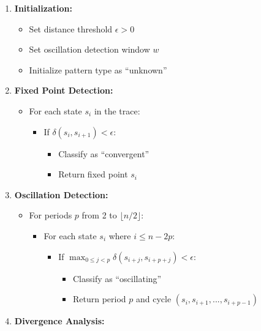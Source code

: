 \documentclass[
]{article}
\providecommand{\tightlist}{%
  \setlength{\itemsep}{0pt}\setlength{\parskip}{0pt}}
\begin{document}
\begin{enumerate}
\def\labelenumi{\arabic{enumi}.}
\tightlist
\item
  \textbf{Initialization:}

  \begin{itemize}
  \tightlist
  \item
    Set distance threshold \(\epsilon > 0\)
  \item
    Set oscillation detection window \(w\)
  \item
    Initialize pattern type as ``unknown''
  \end{itemize}
\item
  \textbf{Fixed Point Detection:}

  \begin{itemize}
  \tightlist
  \item
    For each state \(s_i\) in the trace:

    \begin{itemize}
    \tightlist
    \item
      If \(\delta(s_i, s_{i+1}) < \epsilon\):

      \begin{itemize}
      \tightlist
      \item
        Classify as ``convergent''
      \item
        Return fixed point \(s_i\)
      \end{itemize}
    \end{itemize}
  \end{itemize}
\item
  \textbf{Oscillation Detection:}

  \begin{itemize}
  \tightlist
  \item
    For periods \(p\) from 2 to \(\lfloor n/2 \rfloor\):

    \begin{itemize}
    \tightlist
    \item
      For each state \(s_i\) where \(i \leq n-2p\):

      \begin{itemize}
      \tightlist
      \item
        If
        \(\max_{0 \leq j < p} \delta(s_{i+j}, s_{i+p+j}) < \epsilon\):

        \begin{itemize}
        \tightlist
        \item
          Classify as ``oscillating''
        \item
          Return period \(p\) and cycle
          \((s_i, s_{i+1}, ..., s_{i+p-1})\)
        \end{itemize}
      \end{itemize}
    \end{itemize}
  \end{itemize}
\item
  \textbf{Divergence Analysis:}


\end{enumerate}
\end{document}
